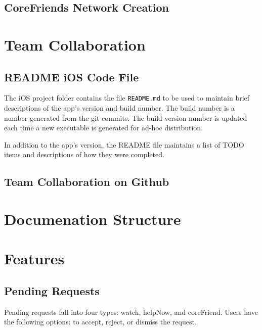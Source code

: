 \subsection{CoreFriends Network Creation}


\section{Team Collaboration}
\subsection{README iOS Code File}
The iOS project folder contains the file \texttt{README.md} to be used to maintain brief
descriptions of the app's version and build number.  The build number is a number 
generated from the git commits. The build version number is updated each time a new 
executable is generated for ad-hoc distribution.

In addition to the app's version, the README file maintains a list of TODO items and 
descriptions of how they were completed.


\subsection{Team Collaboration on Github}
\href{https://help.github.com/articles/resolving-merge-conflicts}{\color{blue}{Resolving merge conflicts}}
\section{Documenation Structure}


\section{Features}

\subsection{Pending Requests}
  Pending requests fall into four types: watch, helpNow, and coreFriend.
  Users have the following options: to accept, reject, or dismiss the request.
  
  
  
